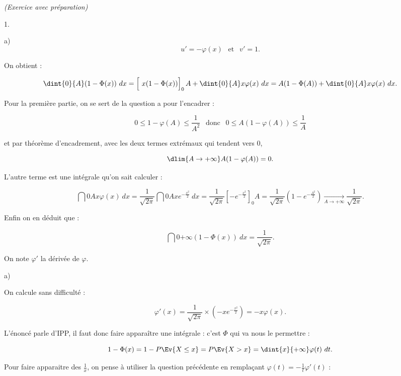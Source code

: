 \documentclass[11pt]{article}%
\begin{document}
\begin{exercice}{\it (Exercice avec préparation)}
\begin{noliste}{1.}
\begin{noliste}{a)}
\[
 u' = - \varphi (x) \ \ \text{ et } \ \ v' = 1. 
\]


 On obtient : 
 
\[
 \dint{0}{A} ( 1 - \Phi (x) ) \ dx = \left[ \ \rule{0cm}{0.4cm} x ( 1 -
\Phi (x) ) \right]_{0}{A} + \dint{0}{A} x \varphi (x) \ dx = A ( 1 -
\Phi ( A) ) + \dint{0}{A} x \varphi (x) \ dx. 
\]

 Pour la première partie, on se sert de la question a pour l'encadrer :

 
\[
 0 \leq 1 - \varphi (A) \leq \frac{ 1 }{ A^{2} } \ \ \text{ donc } \ \
0 \leq A ( 1 - \varphi (A ) ) \leq \frac{ 1 }{ A } 
\]

 et par théorème d'encadrement, avec les deux termes extrémaux qui
tendent vers 0, 
 
\[
 \dlim{ A \rightarrow + \infty } A ( 1 - \varphi (A) ) = 0. 
\]

 L'autre terme est une intégrale qu'on sait calculer : 
 
\[
 \dint{0}{A} x \varphi (x) \ dx = \frac{ 1 }{ \sqrt{ 2 \pi } }
\dint{0}{A} x e^{ - \frac{ x^{2} }{ 2 } } \ dx = \frac{ 1 }{ \sqrt{ 2
\pi } } \left[ - e^{ - \frac{ x^{2} }{ 2 } } \right]_{0}{A} = \frac{ 1
}{ \sqrt{ 2 \pi } } \left( 1 - e^{ - \frac{ A^{2} }{ 2 } } \right)
\xrightarrow[ A \rightarrow + \infty ]{} \frac{ 1 }{ \sqrt{ 2 \pi } }. 
\]

 Enfin on en déduit que : 
 
\[
 \dint{0}{+ \infty} ( 1 - \Phi (x) ) \ dx = \frac{ 1 }{ \sqrt{ 2 \pi }
}. 
\]

 \end{noliste}

 \item On note $\varphi'$ la dérivée de $\varphi$. \begin{noliste}{a)}
 \setlength{\itemsep}{2mm}

 \item On calcule sans difficulté : 
 
\[
 \varphi' (x) = \frac{ 1 }{ \sqrt{ 2 \pi } } \times \left( - x e^{ -
\frac{ x^{2} }{ 2 } } \right) = - x \varphi (x). 
\]

 \item L'énoncé parle d'IPP, il faut donc faire apparaître une
intégrale : c'est $\Phi$ qui va nous le permettre : 
 
\[
 1 - \Phi (x) = 1 - P \Ev{ X \leq x } = P \Ev{ X > x } = \dint{x}{+
\infty} \varphi (t) \ dt. 
\]

 Pour faire apparaitre des $\frac{ 1 }{ x }$, on pense à utiliser la
question précédente en remplaçant $ \varphi (t) = - \frac{ 1 }{ t }
\varphi' (t) $ : 
 

\end{noliste}
\end{noliste}
\end{exercice}
\end{document}
